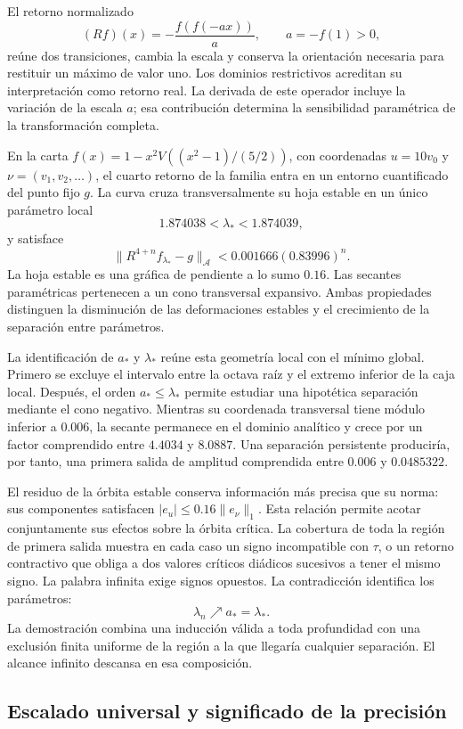 El retorno normalizado
\[
(Rf)(x)=-\frac{f(f(-ax))}{a},\qquad a=-f(1)>0,
\]
reúne dos transiciones, cambia la escala y conserva la orientación necesaria
para restituir un máximo de valor uno. Los dominios restrictivos acreditan
su interpretación como retorno real. La derivada de este operador incluye
la variación de la escala \(a\); esa contribución determina la sensibilidad
paramétrica de la transformación completa.

En la carta \(f(x)=1-x^2V((x^2-1)/(5/2))\), con coordenadas \(u=10v_0\)
y \(\nu=(v_1,v_2,\ldots)\), el cuarto retorno de la familia entra en un
entorno cuantificado del punto fijo \(g\). La curva cruza transversalmente
su hoja estable en un único parámetro local
\[
1.874038<\lambda_*<1.874039,
\]
y satisface
\[
\|R^{4+n}f_{\lambda_*}-g\|_{\mathcal A}
<0.001666(0.83996)^n.
\]
La hoja estable es una gráfica de pendiente a lo sumo \(0.16\). Las
secantes paramétricas pertenecen a un cono transversal expansivo. Ambas
propiedades distinguen la disminución de las deformaciones estables y el
crecimiento de la separación entre parámetros.

La identificación de \(a_*\) y \(\lambda_*\) reúne esta geometría local
con el mínimo global. Primero se excluye el intervalo entre la octava raíz
y el extremo inferior de la caja local. Después, el orden
\(a_*\le\lambda_*\) permite estudiar una hipotética separación mediante
el cono negativo. Mientras su coordenada transversal tiene módulo inferior
a \(0.006\), la secante permanece en el dominio analítico y crece por un
factor comprendido entre \(4.4034\) y \(8.0887\). Una separación persistente
produciría, por tanto, una primera salida de amplitud comprendida entre
\(0.006\) y \(0.0485322\).

El residuo de la órbita estable conserva información más precisa que su
norma: sus componentes satisfacen \(|e_u|\le0.16\|e_\nu\|_1\). Esta
relación permite acotar conjuntamente sus efectos sobre la órbita crítica.
La cobertura de toda la región de primera salida muestra en cada caso un
signo incompatible con \(\tau\), o un retorno contractivo que obliga a dos
valores críticos diádicos sucesivos a tener el mismo signo. La palabra
infinita exige signos opuestos. La contradicción identifica los parámetros:
\[
\lambda_n\nearrow a_*=\lambda_*.
\]
La demostración combina una inducción válida a toda profundidad con una
exclusión finita uniforme de la región a la que llegaría cualquier
separación. El alcance infinito descansa en esa composición.

\subsection{Escalado universal y significado de la precisión}

